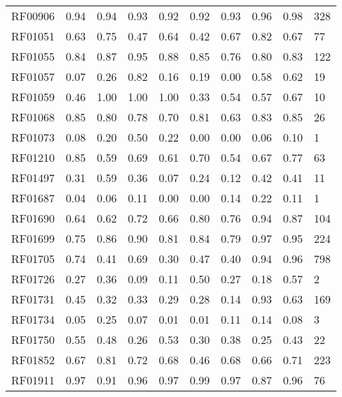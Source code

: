 \begin{tabular}{lrrrrrrrrl}
RF00906      &  0.94 &  0.94 &  0.93 &   0.92 &    0.92 &     0.93 &  0.96 & 0.98 &        328 \\
RF01051      &  0.63 &  0.75 &  0.47 &   0.64 &    0.42 &     0.67 &  0.82 & 0.67 &         77 \\
RF01055      &  0.84 &  0.87 &  0.95 &   0.88 &    0.85 &     0.76 &  0.80 & 0.83 &        122 \\
RF01057      &  0.07 &  0.26 &  0.82 &   0.16 &    0.19 &     0.00 &  0.58 & 0.62 &         19 \\
RF01059      &  0.46 &  1.00 &  1.00 &   1.00 &    0.33 &     0.54 &  0.57 & 0.67 &         10 \\
RF01068      &  0.85 &  0.80 &  0.78 &   0.70 &    0.81 &     0.63 &  0.83 & 0.85 &         26 \\
RF01073      &  0.08 &  0.20 &  0.50 &   0.22 &    0.00 &     0.00 &  0.06 & 0.10 &          1 \\
RF01210      &  0.85 &  0.59 &  0.69 &   0.61 &    0.70 &     0.54 &  0.67 & 0.77 &         63 \\
RF01497      &  0.31 &  0.59 &  0.36 &   0.07 &    0.24 &     0.12 &  0.42 & 0.41 &         11 \\
RF01687      &  0.04 &  0.06 &  0.11 &   0.00 &    0.00 &     0.14 &  0.22 & 0.11 &          1 \\
RF01690      &  0.64 &  0.62 &  0.72 &   0.66 &    0.80 &     0.76 &  0.94 & 0.87 &        104 \\
RF01699      &  0.75 &  0.86 &  0.90 &   0.81 &    0.84 &     0.79 &  0.97 & 0.95 &        224 \\
RF01705      &  0.74 &  0.41 &  0.69 &   0.30 &    0.47 &     0.40 &  0.94 & 0.96 &        798 \\
RF01726      &  0.27 &  0.36 &  0.09 &   0.11 &    0.50 &     0.27 &  0.18 & 0.57 &          2 \\
RF01731      &  0.45 &  0.32 &  0.33 &   0.29 &    0.28 &     0.14 &  0.93 & 0.63 &        169 \\
RF01734      &  0.05 &  0.25 &  0.07 &   0.01 &    0.01 &     0.11 &  0.14 & 0.08 &          3 \\
RF01750      &  0.55 &  0.48 &  0.26 &   0.53 &    0.30 &     0.38 &  0.25 & 0.43 &         22 \\
RF01852      &  0.67 &  0.81 &  0.72 &   0.68 &    0.46 &     0.68 &  0.66 & 0.71 &        223 \\
RF01911      &  0.97 &  0.91 &  0.96 &   0.97 &    0.99 &     0.97 &  0.87 & 0.96 &         76 \\

\end{tabular}
